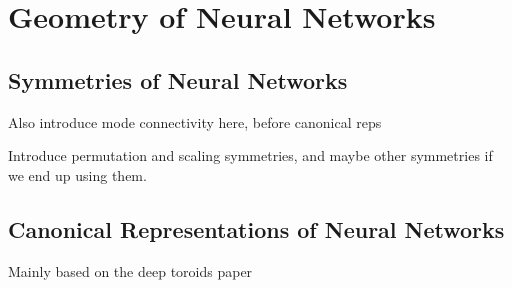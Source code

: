 
\section{Geometry of Neural Networks}\label{section:geometry_of_nns}

\subsection{Symmetries of Neural Networks}

Also introduce mode connectivity here, before canonical reps 

Introduce permutation and scaling symmetries, and maybe other symmetries if we end up using them. 

\subsection{Canonical Representations of Neural Networks}

Mainly based on the deep toroids paper